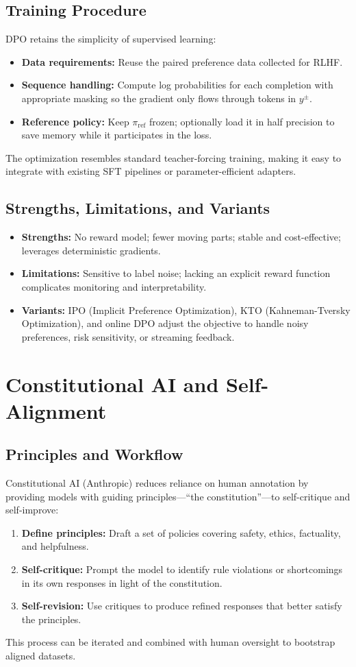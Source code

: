 \documentclass{article}
\begin{document}
\subsection{Training Procedure}
DPO retains the simplicity of supervised learning:
\begin{itemize}
  \item \textbf{Data requirements:} Reuse the paired preference data collected for RLHF.
  \item \textbf{Sequence handling:} Compute log probabilities for each completion with appropriate masking so the gradient only flows through tokens in $y^\pm$.
  \item \textbf{Reference policy:} Keep $\pi_{\text{ref}}$ frozen; optionally load it in half precision to save memory while it participates in the loss.
\end{itemize}
The optimization resembles standard teacher-forcing training, making it easy to integrate with existing SFT pipelines or parameter-efficient adapters.

\subsection{Strengths, Limitations, and Variants}
\begin{itemize}
  \item \textbf{Strengths:} No reward model; fewer moving parts; stable and cost-effective; leverages deterministic gradients.
  \item \textbf{Limitations:} Sensitive to label noise; lacking an explicit reward function complicates monitoring and interpretability.
  \item \textbf{Variants:} IPO (Implicit Preference Optimization), KTO (Kahneman-Tversky Optimization), and online DPO adjust the objective to handle noisy preferences, risk sensitivity, or streaming feedback.
\end{itemize}

\section{Constitutional AI and Self-Alignment}
\subsection{Principles and Workflow}
Constitutional AI (Anthropic) reduces reliance on human annotation by providing models with guiding principles—``the constitution''—to self-critique and self-improve:
\begin{enumerate}
  \item \textbf{Define principles:} Draft a set of policies covering safety, ethics, factuality, and helpfulness.
  \item \textbf{Self-critique:} Prompt the model to identify rule violations or shortcomings in its own responses in light of the constitution.
  \item \textbf{Self-revision:} Use critiques to produce refined responses that better satisfy the principles.
\end{enumerate}
This process can be iterated and combined with human oversight to bootstrap aligned datasets.
\end{document}
